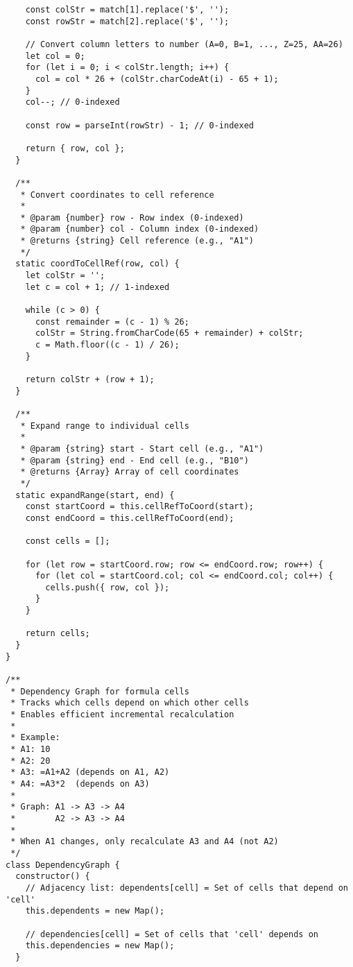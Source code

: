 \documentclass[11pt]{article}
\begin{document}
\begin{verbatim}
    const colStr = match[1].replace('$', '');
    const rowStr = match[2].replace('$', '');
    
    // Convert column letters to number (A=0, B=1, ..., Z=25, AA=26)
    let col = 0;
    for (let i = 0; i < colStr.length; i++) {
      col = col * 26 + (colStr.charCodeAt(i) - 65 + 1);
    }
    col--; // 0-indexed
    
    const row = parseInt(rowStr) - 1; // 0-indexed
    
    return { row, col };
  }
  
  /**
   * Convert coordinates to cell reference
   * 
   * @param {number} row - Row index (0-indexed)
   * @param {number} col - Column index (0-indexed)
   * @returns {string} Cell reference (e.g., "A1")
   */
  static coordToCellRef(row, col) {
    let colStr = '';
    let c = col + 1; // 1-indexed
    
    while (c > 0) {
      const remainder = (c - 1) % 26;
      colStr = String.fromCharCode(65 + remainder) + colStr;
      c = Math.floor((c - 1) / 26);
    }
    
    return colStr + (row + 1);
  }
  
  /**
   * Expand range to individual cells
   * 
   * @param {string} start - Start cell (e.g., "A1")
   * @param {string} end - End cell (e.g., "B10")
   * @returns {Array} Array of cell coordinates
   */
  static expandRange(start, end) {
    const startCoord = this.cellRefToCoord(start);
    const endCoord = this.cellRefToCoord(end);
    
    const cells = [];
    
    for (let row = startCoord.row; row <= endCoord.row; row++) {
      for (let col = startCoord.col; col <= endCoord.col; col++) {
        cells.push({ row, col });
      }
    }
    
    return cells;
  }
}

/**
 * Dependency Graph for formula cells
 * Tracks which cells depend on which other cells
 * Enables efficient incremental recalculation
 * 
 * Example:
 * A1: 10
 * A2: 20
 * A3: =A1+A2 (depends on A1, A2)
 * A4: =A3*2  (depends on A3)
 * 
 * Graph: A1 -> A3 -> A4
 *        A2 -> A3 -> A4
 * 
 * When A1 changes, only recalculate A3 and A4 (not A2)
 */
class DependencyGraph {
  constructor() {
    // Adjacency list: dependents[cell] = Set of cells that depend on 'cell'
    this.dependents = new Map();
    
    // dependencies[cell] = Set of cells that 'cell' depends on
    this.dependencies = new Map();
  }
  

\end{verbatim}
\end{document}
